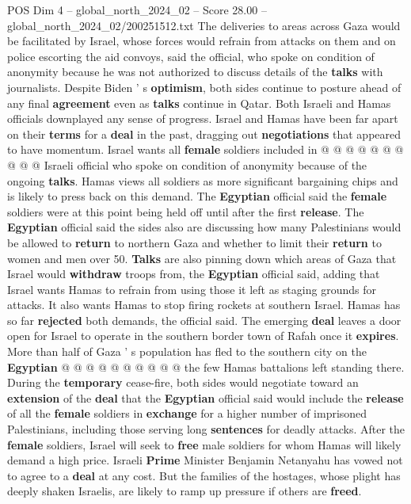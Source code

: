 \begin{textsample}{POS Dim 4 – global\_north\_2024\_02 – Score 28.00 – global\_north\_2024\_02/200251512.txt}
The deliveries to areas across Gaza would be facilitated by Israel, whose forces would refrain from attacks on them and on police escorting the aid convoys, said the official, who spoke on condition of anonymity because he was not authorized to discuss details of the \textbf{talks} with journalists.
Despite Biden ' s \textbf{optimism}, both sides continue to posture ahead of any final \textbf{agreement} even as \textbf{talks} continue in Qatar.
Both Israeli and Hamas officials downplayed any sense of progress.
Israel and Hamas have been far apart on their \textbf{terms} for a \textbf{deal} in the past, dragging out \textbf{negotiations} that appeared to have momentum.
Israel wants all \textbf{female} soldiers included in @ @ @ @ @ @ @ @ @ @ Israeli official who spoke on condition of anonymity because of the ongoing \textbf{talks}.
Hamas views all soldiers as more significant bargaining chips and is likely to press back on this demand.
The \textbf{Egyptian} official said the \textbf{female} soldiers were at this point being held off until after the first \textbf{release}.
The \textbf{Egyptian} official said the sides also are discussing how many Palestinians would be allowed to \textbf{return} to northern Gaza and whether to limit their \textbf{return} to women and men over 50. \textbf{Talks} are also pinning down which areas of Gaza that Israel would \textbf{withdraw} troops from, the \textbf{Egyptian} official said, adding that Israel wants Hamas to refrain from using those it left as staging grounds for attacks.
It also wants Hamas to stop firing rockets at southern Israel.
Hamas has so far \textbf{rejected} both demands, the official said.
The emerging \textbf{deal} leaves a door open for Israel to operate in the southern border town of Rafah once it \textbf{expires}.
More than half of Gaza ' s population has fled to the southern city on the \textbf{Egyptian} @ @ @ @ @ @ @ @ @ @ the few Hamas battalions left standing there.
During the \textbf{temporary} cease-fire, both sides would negotiate toward an \textbf{extension} of the \textbf{deal} that the \textbf{Egyptian} official said would include the \textbf{release} of all the \textbf{female} soldiers in \textbf{exchange} for a higher number of imprisoned Palestinians, including those serving long \textbf{sentences} for deadly attacks.
After the \textbf{female} soldiers, Israel will seek to \textbf{free} male soldiers for whom Hamas will likely demand a high price.
Israeli \textbf{Prime} Minister Benjamin Netanyahu has vowed not to agree to a \textbf{deal} at any cost.
But the families of the hostages, whose plight has deeply shaken Israelis, are likely to ramp up pressure if others are \textbf{freed}.

\end{textsample}
